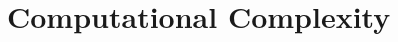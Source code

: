 \documentclass[../main.tex]{subfiles}
\begin{document}

%


\section{Computational Complexity}
\label{section:multi_comp_analysis}
\end{document}
